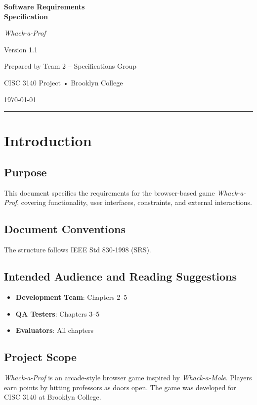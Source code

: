 \documentclass[11pt]{scrreprt}
\date{\today}
\newcommand*{\product}{\textit{Whack-a-Prof}\xspace}
\def\version{1.1}
\begin{document}
\begin{titlepage}
  \centering
  {\Huge\bfseries Software Requirements\\[4pt] Specification\par}
  \vspace{1.5cm}
  {\LARGE \product\par}
  \vfill
  {\Large Version \version\par}
  \vspace{1cm}
  {\large Prepared by Team 2 – Specifications Group\par}
  {\large CISC 3140 Project • Brooklyn College\par}
  {\large \today}
  \vfill
  \rule{\linewidth}{0.5mm}
\end{titlepage}

\tableofcontents
\clearpage

\chapter{Introduction}

\section{Purpose}
This document specifies the requirements for the browser-based game \product, covering functionality, user interfaces, constraints, and external interactions.

\section{Document Conventions}
The structure follows IEEE Std 830-1998 (SRS).

\section{Intended Audience and Reading Suggestions}
\begin{itemize}
  \item \textbf{Development Team}: Chapters 2–5
  \item \textbf{QA Testers}: Chapters 3–5
  \item \textbf{Evaluators}: All chapters
\end{itemize}

\section{Project Scope}
\product is an arcade-style browser game inspired by \emph{Whack-a-Mole}. Players earn points by hitting professors as doors open. The game was developed for CISC 3140 at Brooklyn College.
\end{document}
